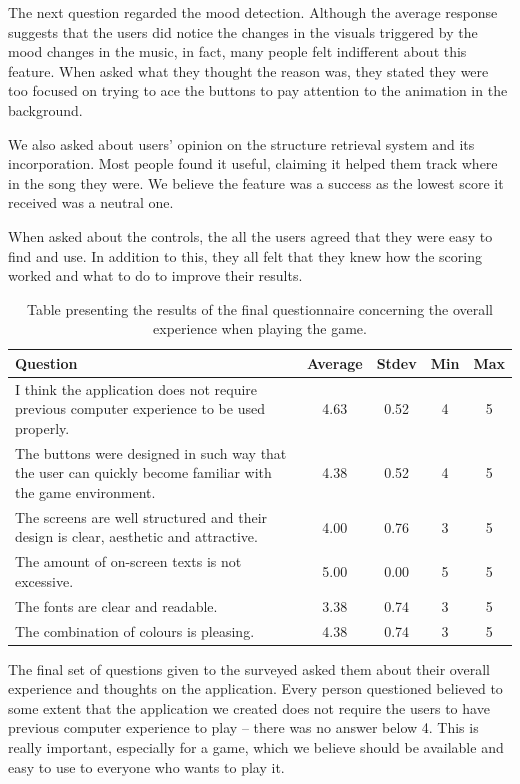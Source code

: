 The next question regarded the mood detection. Although the average response suggests that the users did notice the changes in the visuals triggered by the mood changes in the music, in fact, many people felt indifferent about this feature. When asked what they thought the reason was, they stated they were too focused on trying to ace the buttons to pay attention to the animation in the background.

We also asked about users' opinion on the structure retrieval system and its incorporation. Most people found it useful, claiming it helped them track where in the song they were. We believe the feature was a success as the lowest score it received was a neutral one. 

When asked about the controls, the all the users agreed that they were easy to find and use. In addition to this, they all felt that they knew how the scoring worked and what to do to improve their results. 

\begin{table}
\begin{center}
\begin{tabular}{| p{8cm} | c | c | c | c | } 																			   \hline 
 \textbf{Question} & \textbf{Average} & \textbf{Stdev} & \textbf{Min} & \textbf{Max }	\\ \hline \hline
 I think the application does not require previous computer experience to be used properly. & 4.63 & 0.52 & 4 & 5 \\ \hline
 The buttons were designed in such way that the user can quickly become familiar with the game environment. & 4.38 & 0.52 & 4 & 5 \\ \hline
 The screens are well structured and their design is clear, aesthetic and attractive.  & 4.00 & 0.76 & 3 & 5 \\ \hline
 The amount of on-screen texts is not excessive. 	& 5.00 & 0.00 & 5 & 5 \\ \hline
 The fonts are clear and readable. 						& 3.38 & 0.74 & 3 & 5 \\ \hline
 The combination of colours is pleasing. 				& 4.38 & 0.74 & 3 & 5 \\ \hline
 \end{tabular}
\caption{Table presenting the results of the final questionnaire concerning the overall experience when playing the game.}
\label{table:finalquestionsoverall}
\end{center}
\end{table}

The final set of questions given to the surveyed asked them about their overall experience and thoughts on the application. Every person questioned believed to some extent that the application we created does not require the users to have previous computer experience to play -- there was no answer below 4. This is really important, especially for a game, which we believe should be available and easy to use to everyone who wants to play it. 

